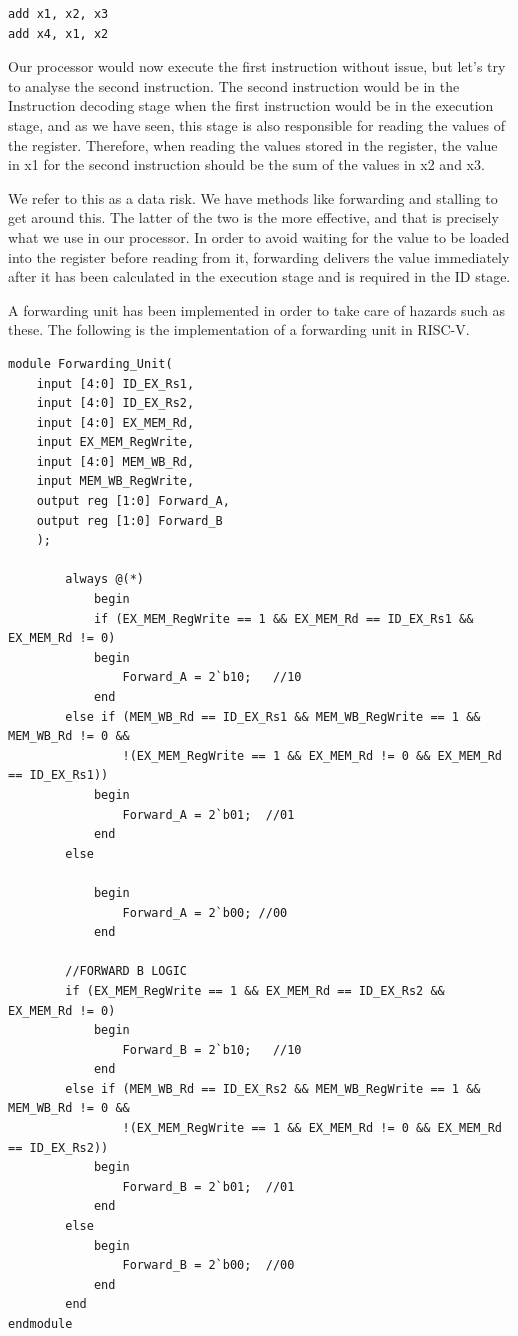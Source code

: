 \documentclass{article}
\begin{document}
\begin{lstlisting}[caption={Arbitrary Set of instructions}, captionpos=b, language=RISC-V]
add x1, x2, x3
add x4, x1, x2
\end{lstlisting}

Our processor would now execute the first instruction without issue, but let's try to analyse the second instruction. The second instruction would be in the Instruction decoding stage when the first instruction would be in the execution stage, and as we have seen, this stage is also responsible for reading the values of the register. Therefore, when reading the values stored in the register, the value in x1 for the second instruction should be the sum of the values in x2 and x3. 

We refer to this as a data risk. We have methods like forwarding and stalling to get around this. The latter of the two is the more effective, and that is precisely what we use in our processor. In order to avoid waiting for the value to be loaded into the register before reading from it, forwarding delivers the value immediately after it has been calculated in the execution stage and is required in the ID stage.

A forwarding unit has been implemented in order to take care of hazards such as these. The following is the implementation of a forwarding unit in RISC-V. 

\begin{lstlisting}[caption={Forwarding Unit}, captionpos=b, language=RISC-V]
module Forwarding_Unit(
    input [4:0] ID_EX_Rs1,
    input [4:0] ID_EX_Rs2,
    input [4:0] EX_MEM_Rd,
    input EX_MEM_RegWrite,
    input [4:0] MEM_WB_Rd,
    input MEM_WB_RegWrite,
    output reg [1:0] Forward_A,
    output reg [1:0] Forward_B
    );
    
        always @(*)
            begin
            if (EX_MEM_RegWrite == 1 && EX_MEM_Rd == ID_EX_Rs1 && EX_MEM_Rd != 0)
            begin
                Forward_A = 2`b10;   //10
            end
        else if (MEM_WB_Rd == ID_EX_Rs1 && MEM_WB_RegWrite == 1 && MEM_WB_Rd != 0 &&
                !(EX_MEM_RegWrite == 1 && EX_MEM_Rd != 0 && EX_MEM_Rd == ID_EX_Rs1))
            begin
                Forward_A = 2`b01;  //01
            end
        else

            begin
                Forward_A = 2`b00; //00
            end

        //FORWARD B LOGIC
        if (EX_MEM_RegWrite == 1 && EX_MEM_Rd == ID_EX_Rs2 && EX_MEM_Rd != 0)
            begin
                Forward_B = 2`b10;   //10
            end
        else if (MEM_WB_Rd == ID_EX_Rs2 && MEM_WB_RegWrite == 1 && MEM_WB_Rd != 0 &&
                !(EX_MEM_RegWrite == 1 && EX_MEM_Rd != 0 && EX_MEM_Rd == ID_EX_Rs2))
            begin
                Forward_B = 2`b01;  //01
            end
        else  
            begin
                Forward_B = 2`b00;  //00
            end
        end
endmodule
\end{lstlisting}
\end{document}
